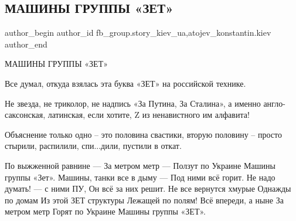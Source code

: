  
 
 
 
 
 
\subsection{МАШИНЫ ГРУППЫ «ЗЕТ»}
\label{sec:07_03_2022.fb.fb_group.story_kiev_ua.2.mashyny_gruppy_zet}
 
\ifcmt
 author_begin
   author_id fb_group.story_kiev_ua,atojev_konstantin.kiev
 author_end
\fi

МАШИНЫ ГРУППЫ «ЗЕТ»

Все думал, откуда взялась эта буква «ЗЕТ» на российской технике.

Не звезда, не триколор, не надпись «За Путина, За Сталина», а именно
англо-саксонская,  латинская, если хотите, Z из ненавистного им алфавита!


Объяснение только одно – это половина свастики, вторую половину – просто
стырили, распилили, спи...дили, пустили в откат.

\raggedcolumns
\begin{multicols}{2} %
\setlength{\parindent}{0pt}
\obeycr
По выжженной равнине —
За метром метр —
Ползут по Украине
Машины группы «Зет».
\smallskip
Машины, танки все в дыму —
Под ними всё горит.
Не надо думать! — с ними ПУ,
Он всё за них решит.
\smallskip
Не все вернутся хмурые
Однажды по домам
Из этой ЗЕТ структуры
Лежащей по полям!
\smallskip
Всё впереди, а ныне
За метром метр
Горят по Украине
Машины группы «ЗЕТ».
\restorecr
\end{multicols} %

